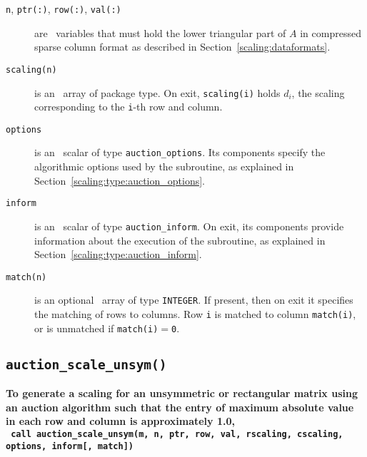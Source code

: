 \begin{description}

\item[\texttt{n}, \texttt{ptr(:)}, \texttt{row(:)}, \texttt{val(:)}] are \intentin\ variables that must hold the lower triangular part of $A$ in compressed sparse column format as described in Section~\ref{scaling:dataformats}.

\item[\texttt{scaling(n)}] is an \intentout\ array of package type. On exit,
\texttt{scaling(i)} holds $d_i$, the scaling corresponding to the
\texttt{i}-th row and column.

\item[\texttt{options}] is an \intentin\ scalar of type \texttt{auction\_options}. Its components specify the algorithmic options used by the subroutine, as explained in Section~\ref{scaling:type:auction_options}.

\item[\texttt{inform}] is an \intentout\ scalar of type \texttt{auction\_inform}. On exit, its components provide information about the execution of the subroutine, as explained in Section~\ref{scaling:type:auction_inform}.

\item[\texttt{match(n)}] is an optional \intentout\ array of type {\tt INTEGER}. If present, then on exit it specifies the matching of rows to
columns. Row \texttt{i} is matched to column \texttt{match(i)}, or is unmatched
if \texttt{match(i)}$=$\texttt{0}.

\end{description}

\subsection{\texttt{auction\_scale\_unsym()}}

\textbf{\noindent
   To generate a scaling for an unsymmetric or rectangular matrix using an auction algorithm such that the entry of maximum absolute value in each row and column is approximately 1.0,
   \vspace*{0.3cm} \\
   \texttt{ \hspace*{0.2cm}
      call auction\_scale\_unsym(m, n, ptr, row, val, rscaling, cscaling, options, inform[, match])
   }
}

